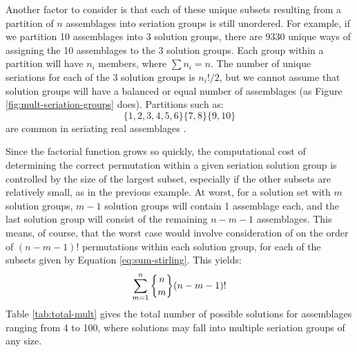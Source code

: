 Another factor to consider is that each of these unique subsets resulting from a partition of $n$ assemblages into seriation groups is still unordered.  For example, if we partition 10 assemblages into 3 solution groups, there are 9330 unique ways of assigning the 10 assemblages to the 3 solution groups.  Each group within a partition will have $n_i$ members, where $\sum n_i = n$.   The number of unique seriations for each of the 3 solution groups is $n_i ! / 2$, but we cannot assume that solution groups will have a balanced or equal number of assemblages (as Figure \ref{fig:mult-seriation-groups} does).  Partitions such as:
\begin{equation*}
\{1,2,3,4,5,6\} \{7,8\} \{9,10\}  
\end{equation*}
are common in seriating real assemblages \citep{Lipo2001b}.   







Since the factorial function grows so quickly, the computational cost of determining the correct permutation within a given seriation solution group is controlled by the size of the largest subset, especially if the other subsets are relatively small, as in the previous example.  At worst, for a solution set with $m$ solution groups, $m-1$ solution groups will contain 1 assemblage each, and the last solution group will consist of the remaining $n-m-1$ assemblages.  This means, of course, that the worst case would involve consideration of on the order of $(n-m-1)!$ permutations within each solution group, for each of the subsets given by Equation \ref{eq:sum-stirling}.  This yields:
\begin{equation}
\sum_{m=1}^n \stirlingsubset{n}{m} (n-m-1)!
\end{equation}
Table \ref{tab:total-mult} gives the total number of possible solutions for assemblages ranging from 4 to 100, where solutions may fall into multiple seriation groups of any size.  

